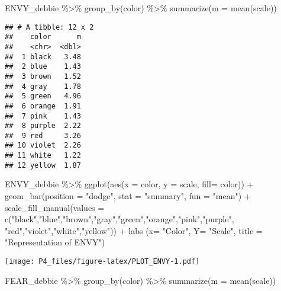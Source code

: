 \documentclass[
]{article}
\newenvironment{Shaded}{\begin{snugshade}}{\end{snugshade}}
\newcommand{\AttributeTok}[1]{\textcolor[rgb]{0.77,0.63,0.00}{#1}}
\newcommand{\FunctionTok}[1]{\textcolor[rgb]{0.00,0.00,0.00}{#1}}
\newcommand{\NormalTok}[1]{#1}
\newcommand{\SpecialCharTok}[1]{\textcolor[rgb]{0.00,0.00,0.00}{#1}}
\newcommand{\StringTok}[1]{\textcolor[rgb]{0.31,0.60,0.02}{#1}}
\begin{document}
\begin{Shaded}
\begin{Highlighting}[]
\NormalTok{ENVY\_debbie }\SpecialCharTok{\%\textgreater{}\%}
  \FunctionTok{group\_by}\NormalTok{(color) }\SpecialCharTok{\%\textgreater{}\%} 
  \FunctionTok{summarize}\NormalTok{(}\AttributeTok{m =} \FunctionTok{mean}\NormalTok{(scale))}
\end{Highlighting}
\end{Shaded}

\begin{verbatim}
## # A tibble: 12 x 2
##    color      m
##    <chr>  <dbl>
##  1 black   3.48
##  2 blue    1.43
##  3 brown   1.52
##  4 gray    1.78
##  5 green   4.96
##  6 orange  1.91
##  7 pink    1.43
##  8 purple  2.22
##  9 red     3.26
## 10 violet  2.26
## 11 white   1.22
## 12 yellow  1.87
\end{verbatim}

\begin{Shaded}
\begin{Highlighting}[]
\NormalTok{ENVY\_debbie }\SpecialCharTok{\%\textgreater{}\%}
  \FunctionTok{ggplot}\NormalTok{(}\FunctionTok{aes}\NormalTok{(}\AttributeTok{x =}\NormalTok{ color, }\AttributeTok{y =}\NormalTok{ scale, }\AttributeTok{fill=}\NormalTok{ color)) }\SpecialCharTok{+}
  \FunctionTok{geom\_bar}\NormalTok{(}\AttributeTok{position =} \StringTok{"dodge"}\NormalTok{, }\AttributeTok{stat =} \StringTok{"summary"}\NormalTok{, }\AttributeTok{fun =} \StringTok{"mean"}\NormalTok{) }\SpecialCharTok{+} \FunctionTok{scale\_fill\_manual}\NormalTok{(}\AttributeTok{values =} \FunctionTok{c}\NormalTok{(}\StringTok{"black"}\NormalTok{,}\StringTok{"blue"}\NormalTok{,}\StringTok{"brown"}\NormalTok{,}\StringTok{"gray"}\NormalTok{,}\StringTok{"green"}\NormalTok{,}\StringTok{"orange"}\NormalTok{,}\StringTok{"pink"}\NormalTok{,}\StringTok{"purple"}\NormalTok{, }\StringTok{"red"}\NormalTok{,}\StringTok{"violet"}\NormalTok{,}\StringTok{"white"}\NormalTok{,}\StringTok{"yellow"}\NormalTok{)) }\SpecialCharTok{+} \FunctionTok{labs}\NormalTok{ (}\AttributeTok{x=} \StringTok{"Color"}\NormalTok{, }\AttributeTok{Y=} \StringTok{"Scale"}\NormalTok{, }\AttributeTok{title =} \StringTok{"Representation of ENVY"}\NormalTok{)}
\end{Highlighting}
\end{Shaded}

\texttt{[image: P4\_files/figure-latex/PLOT\_ENVY-1.pdf]}

\begin{Shaded}
\begin{Highlighting}[]
\NormalTok{FEAR\_debbie }\SpecialCharTok{\%\textgreater{}\%}
  \FunctionTok{group\_by}\NormalTok{(color) }\SpecialCharTok{\%\textgreater{}\%} 
  \FunctionTok{summarize}\NormalTok{(}\AttributeTok{m =} \FunctionTok{mean}\NormalTok{(scale))}
\end{Highlighting}
\end{Shaded}
\end{document}
